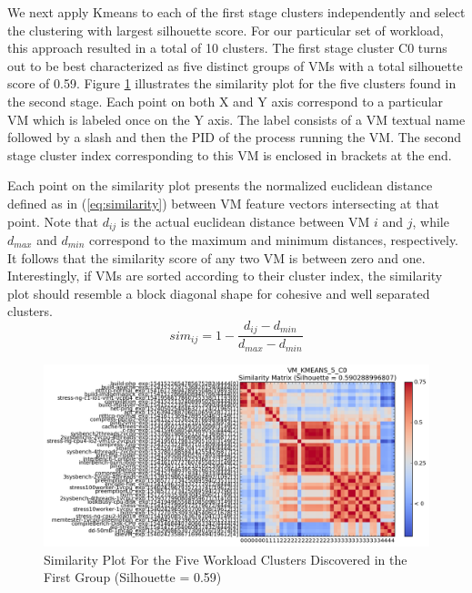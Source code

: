 \documentclass[10pt, conference, compsocconf]{IEEEtran}
\begin{document}
We next apply Kmeans to each of the first stage clusters independently and select the clustering with largest silhouette score. For our particular set of workload, this approach resulted in a total of 10 clusters. The first stage cluster C0 turns out to be best characterized as five distinct groups of VMs with a total silhouette score of 0.59. Figure \ref{fig:c0-sim} illustrates the similarity plot for the five clusters found in the second stage. Each point on both X and Y axis correspond to a particular VM which is labeled once on the Y axis. The label consists of a VM textual name followed by a slash and then the PID of the process running the VM. The second stage cluster index corresponding to this VM is enclosed in brackets at the end. 

Each point on the similarity plot presents the normalized euclidean distance defined as in (\ref{eq:similarity}) between VM feature vectors intersecting at that point. Note that $d_{ij}$ is the actual euclidean distance between VM $i$ and $j$, while $d_{max}$ and $d_{min}$ correspond to the maximum and minimum distances, respectively. It follows that the similarity score of any two VM is between zero and one. Interestingly, if VMs are sorted according to their cluster index, the similarity plot should resemble a block diagonal shape for cohesive and well separated clusters. 
%
\begin{equation}
sim_{ij} = 1-\frac{d_{ij}-d_{min}}{d_{max}-d_{min}}
\label{eq:similarity}
\end{equation}
%
\begin{figure}[!htpb]
\centering
\includegraphics[width=\textwidth]{figs/VM_KMEANS_5_C0.png}
\caption{Similarity Plot For the Five Workload Clusters Discovered in the First Group (Silhouette = 0.59)}
\label{fig:c0-sim}
\end{figure}
\end{document}
